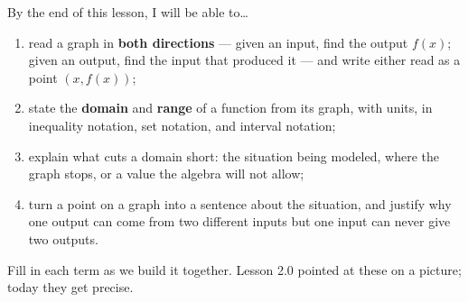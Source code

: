 \documentclass[10pt]{article}
\begin{document}

\vspace{0.15in}

\begin{objectivebox}
\small
By the end of this lesson, I will be able to\dots
\begin{enumerate}[leftmargin=1.5em, itemsep=2pt, topsep=3pt]
  \item read a graph in \textbf{both directions} --- given an input, find the output $f(x)$; given
        an output, find the input that produced it --- and write either read as a point
        $(x, f(x))$;
  \item state the \textbf{domain} and \textbf{range} of a function from its graph, with units, in
        inequality notation, set notation, and interval notation;
  \item explain what cuts a domain short: the situation being modeled, where the graph stops, or a
        value the algebra will not allow;
  \item turn a point on a graph into a sentence about the situation, and justify why one output
        can come from two different inputs but one input can never give two outputs.
\end{enumerate}
\end{objectivebox}

\vspace{0.10in}

\boxguard
\begin{vocabbox}
\small
Fill in each term as we build it together. Lesson 2.0 pointed at these on a picture; today they
get precise.
\end{vocabbox}
\end{document}

